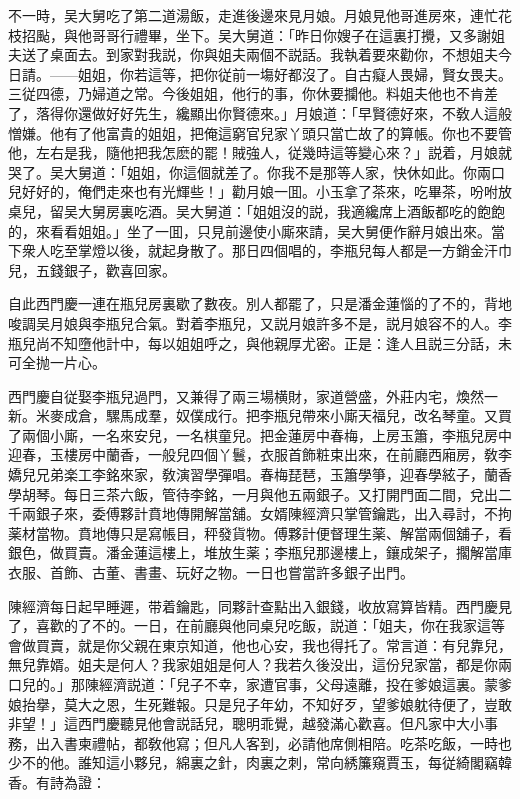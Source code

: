 不一時，吴大舅吃了第二道湯飯，走進後邊來見月娘。月娘見他哥進房來，連忙花枝招颭，與他哥哥行禮畢，坐下。吴大舅道：「昨日你嫂子在這裏打攪，又多謝姐夫送了桌面去。到家對我説，你與姐夫兩個不説話。我執着要來勸你，不想姐夫今日請。——姐姐，你若這等，把你従前一塲好都沒了。自古癡人畏婦，賢女畏夫。三従四德，乃婦道之常。今後姐姐，他行的事，你休要攔他。料姐夫他也不肯差了，落得你還做好好先生，纔顯出你賢德來。」月娘道：「早賢德好來，不敎人這般憎嫌。他有了他富貴的姐姐，把俺這窮官兒家丫頭只當亡故了的算帳。你也不要管他，左右是我，隨他把我怎麽的罷！賊強人，従幾時這等變心來？」説着，月娘就哭了。吴大舅道：「姐姐，你這個就差了。你我不是那等人家，快休如此。你兩口兒好好的，俺們走來也有光輝些！」勸月娘一囬。小玉拿了茶來，吃畢茶，吩咐放桌兒，留吴大舅房裏吃酒。吴大舅道：「姐姐沒的説，我適纔席上酒飯都吃的飽飽的，來看看姐姐。」坐了一囬，只見前邊使小廝來請，吴大舅便作辭月娘出來。當下衆人吃至掌燈以後，就起身散了。那日四個唱的，李瓶兒每人都是一方銷金汗巾兒，五錢銀子，歡喜回家。

自此西門慶一連在瓶兒房裏歇了數夜。別人都罷了，只是潘金蓮惱的了不的，背地唆調吴月娘與李瓶兒合氣。對着李瓶兒，又説月娘許多不是，説月娘容不的人。李瓶兒尚不知墮他計中，每以姐姐呼之，與他親厚尤密。正是：逢人且説三分話，未可全抛一片心。

西門慶自従娶李瓶兒過門，又兼得了兩三場横財，家道營盛，外莊内宅，煥然一新。米麥成倉，騾馬成羣，奴僕成行。把李瓶兒帶來小廝天福兒，改名琴童。又買了兩個小廝，一名來安兒，一名棋童兒。把金蓮房中春梅，上房玉簫，李瓶兒房中迎春，玉樓房中蘭香，一般兒四個丫鬟，衣服首飾粧束出來，在前廳西廂房，敎李嬌兒兄弟楽工李銘來家，敎演習學彈唱。春梅琵琶，玉簫學箏，迎春學絃子，蘭香學胡琴。每日三茶六飯，管待李銘，一月與他五兩銀子。又打開門面二間，兌出二千兩銀子來，委傅夥計賁地傳開解當舖。女婿陳經濟只掌管鑰匙，出入尋討，不拘薬材當物。賁地傳只是寫帳目，秤發貨物。傅夥計便督理生薬、解當兩個舖子，看銀色，做買賣。潘金蓮這樓上，堆放生薬；李瓶兒那邊樓上，鑲成架子，擱解當庫衣服、首飾、古董、書畫、玩好之物。一日也嘗當許多銀子出門。

陳經濟每日起早睡遲，带着鑰匙，同夥計查點出入銀錢，收放寫算皆精。西門慶見了，喜歡的了不的。一日，在前廳與他同桌兒吃飯，説道：「姐夫，你在我家這等會做買賣，就是你父親在東京知道，他也心安，我也得托了。常言道：有兒靠兒，無兒靠婿。姐夫是何人？我家姐姐是何人？我若久後没出，這份兒家當，都是你兩口兒的。」那陳經濟説道：「兒子不幸，家遭官事，父母遠離，投在爹娘這裏。蒙爹娘抬擧，莫大之恩，生死難報。只是兒子年幼，不知好歹，望爹娘躭待便了，豈敢非望！」這西門慶聽見他會説話兒，聰明乖覺，越發滿心歡喜。但凡家中大小事務，出入書柬禮帖，都敎他寫；但凡人客到，必請他席側相陪。吃茶吃飯，一時也少不的他。誰知這小夥兒，綿裏之針，肉裏之刺，常向綉簾窺賈玉，每従綺閣竊韓香。有詩為證：

